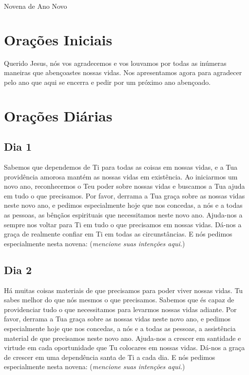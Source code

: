 \documentclass[a4paper,14pt]{extarticle} \usepackage[utf8]{inputenc}
\begin{document}
\begin{center}
  {\huge Novena de Ano Novo}
\end{center}


\tableofcontents
\thispagestyle{empty}

\newpage

\newpage

\section{Orações Iniciais}

Querido Jesus, nós vos agradecemos e vos louvamos por todas as inúmeras maneiras que abençoastes nossas vidas. Nos apresentamos agora para agradecer pelo ano que aqui se encerra e pedir por um próximo ano abençoado.

\section{Orações Diárias}

\subsection{Dia 1}

Sabemos que dependemos de Ti para todas as coisas em nossas vidas, e a Tua providência amorosa mantém as nossas vidas em existência. Ao iniciarmos um novo ano, reconhecemos o Teu poder sobre nossas vidas e buscamos a Tua ajuda em tudo o que precisamos.
Por favor, derrama a Tua graça sobre as nossas vidas neste novo ano, e pedimos especialmente hoje que nos concedas, a nós e a todas as pessoas, as bênçãos espirituais que necessitamos neste novo ano.
Ajuda-nos a sempre nos voltar para Ti em tudo o que precisamos em nossas vidas. Dá-nos a graça de realmente confiar em Ti em todas as circunstâncias.
E nós pedimos especialmente nesta novena: (\textit{mencione suas intenções aqui.})

\subsection{Dia 2}

Há muitas coisas materiais de que precisamos para poder viver nossas vidas. Tu sabes melhor do que nós mesmos o que precisamos. Sabemos que és capaz de providenciar tudo o que necessitamos para levarmos nossas vidas adiante.
Por favor, derrama a Tua graça sobre as nossas vidas neste novo ano, e pedimos especialmente hoje que nos concedas, a nós e a todas as pessoas, a assistência material de que precisamos neste novo ano.
Ajuda-nos a crescer em santidade e virtude em cada oportunidade que Tu colocares em nossas vidas. Dá-nos a graça de crescer em uma dependência santa de Ti a cada dia.
E nós pedimos especialmente nesta novena: (\textit{mencione suas intenções aqui.})
\end{document}
